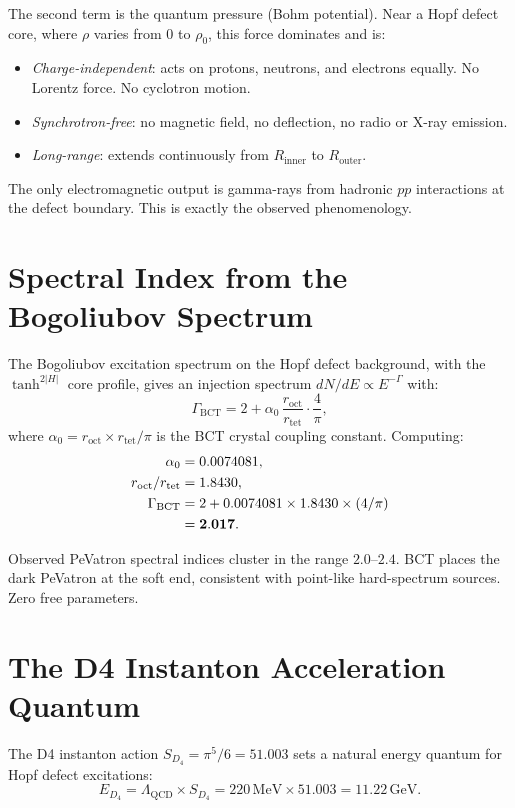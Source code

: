 \documentclass[twocolumn,prl,showpacs,preprintnumbers,amsmath,amssymb]{revtex4-1}
\begin{document}
The second term is the quantum pressure (Bohm potential). Near a Hopf
defect core, where $\rho$ varies from 0 to $\rho_0$, this force
dominates and is:
\begin{itemize}
\item \emph{Charge-independent}: acts on protons, neutrons, and
electrons equally. No Lorentz force. No cyclotron motion.
\item \emph{Synchrotron-free}: no magnetic field, no deflection,
no radio or X-ray emission.
\item \emph{Long-range}: extends continuously from $R_\mathrm{inner}$
to $R_\mathrm{outer}$.
\end{itemize}

The only electromagnetic output is gamma-rays from hadronic $pp$
interactions at the defect boundary. This is exactly the observed
phenomenology.

\section{Spectral Index from the Bogoliubov Spectrum}

The Bogoliubov excitation spectrum on the Hopf defect background,
with the $\tanh^{2|H|}$ core profile, gives an injection spectrum
$dN/dE \propto E^{-\Gamma}$ with:
\begin{equation}
\Gamma_\mathrm{BCT} = 2 + \alpha_0\,\frac{r_\mathrm{oct}}{r_\mathrm{tet}}
\cdot\frac{4}{\pi},
\end{equation}
where $\alpha_0 = r_\mathrm{oct}\times r_\mathrm{tet}/\pi$ is the BCT
crystal coupling constant. Computing:
\begin{align}
\alpha_0 &= 0.0074081, \\
r_\mathrm{oct}/r_\mathrm{tet} &= 1.8430, \\
\Gamma_\mathrm{BCT} &= 2 + 0.0074081\times 1.8430\times(4/\pi) \notag\\
&= \mathbf{2.017}.
\end{align}

Observed PeVatron spectral indices cluster in the range $2.0$--$2.4$.
BCT places the dark PeVatron at the soft end, consistent with
point-like hard-spectrum sources. Zero free parameters.

\section{The D4 Instanton Acceleration Quantum}

The D4 instanton action $S_{D_4} = \pi^5/6 = 51.003$ sets a natural
energy quantum for Hopf defect excitations:
\begin{equation}
E_{D_4} = \Lambda_\mathrm{QCD}\times S_{D_4} = 220\,\mathrm{MeV}
\times 51.003 = 11.22\,\mathrm{GeV}.
\end{equation}
\end{document}
